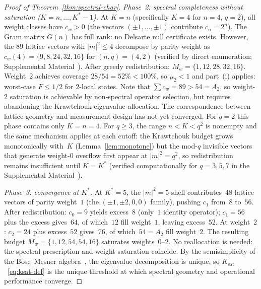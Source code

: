 \documentclass[twocolumn,prx,aps,superscriptaddress,longbibliography,floatfix]{revtex4-2}
\begin{document}
\begin{proof}[Proof of Theorem~\ref{thm:spectral-char}]
\emph{Phase~2: spectral completeness without saturation
($K = n, \ldots, K^*{-}1$).}
At $K = n$ (specifically $K = 4$ for $n = 4$, $q = 2$),
all weight classes have $c_w > 0$ (the vectors
$(\pm 1, \ldots, \pm 1)$ contribute $c_n = 2^n$).
The Gram matrix $G(n)$ has full rank:
no Delsarte null certificate exists.
However, the $89$ lattice vectors with $|m|^2 \le 4$
decompose by parity weight as
$c_w(4) = \{9, 8, 24, 32, 16\}$ for $(n,q) = (4,2)$
(verified by direct enumeration;
Supplemental Material~\cite{supplemental}).
After greedy redistribution: $M_w = \{1, 12, 28, 32, 16\}$.
Weight~$2$ achieves coverage $28/54 = 52\% < 100\%$,
so $\mu_2 < 1$ and part~(i) applies:
worst-case $F \le 1/2$ for $2$-local states.
Note that $\sum c_w = 89 > 54 = A_2$, so weight-$2$
saturation is achievable by non-spectral operator
selection, but requires abandoning the Krawtchouk
eigenvalue allocation.  The correspondence between
lattice geometry and measurement design has not yet
converged.
For $q = 2$ this phase contains only $K = n = 4$.
For $q \ge 3$, the range $n < K < q^2$ is nonempty and
the same mechanism applies at each cutoff: the
Krawtchouk budget grows monotonically with~$K$
(Lemma~\ref{lem:monotone}) but the mod-$q$
invisible vectors that generate weight-$0$ overflow
first appear at $|m|^2 = q^2$, so
redistribution remains insufficient
until $K = K^*$ (verified computationally for
$q = 3, 5, 7$ in the Supplemental
Material~\cite{supplemental}).

\emph{Phase~3: convergence at $K^*$.}
At $K^* = 5$, the $|m|^2 = 5$ shell contributes~$48$
lattice vectors of parity weight~$1$
(the $(\pm 1, \pm 2, 0, 0)$ family),
pushing $c_1$ from~$8$ to~$56$.
After redistribution: $c_0 = 9$ yields excess~$8$
(only~$1$ identity operator);
$c_1 = 56$ plus the excess gives~$64$, of which~$12$
fill weight~$1$, leaving excess~$52$.
At weight~$2$: $c_2 = 24$ plus excess~$52$ gives~$76$,
of which~$54 = A_2$ fill weight~$2$.
The resulting budget $M_w = \{1, 12, 54, 54, 16\}$
saturates weights~$0$--$2$.
No reallocation is needed: the spectral prescription
and weight saturation coincide.
By the semisimplicity of the Bose--Mesner
algebra~\cite{BannaiIto1984}, the eigenvalue
decomposition is unique, so $K_{\mathrm{sat}}$~\eqref{eq:ksat-def}
is the unique threshold at which spectral geometry
and operational performance converge.
\end{proof}
\end{document}
